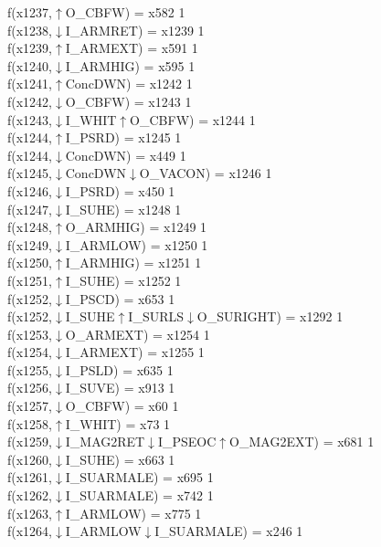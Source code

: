 f(x1237,$\uparrow$O\_CBFW) = x582 {1} \\
f(x1238,$\downarrow$I\_ARMRET) = x1239 {1} \\
f(x1239,$\uparrow$I\_ARMEXT) = x591 {1} \\
f(x1240,$\downarrow$I\_ARMHIG) = x595 {1} \\
f(x1241,$\uparrow$ConcDWN) = x1242 {1} \\
f(x1242,$\downarrow$O\_CBFW) = x1243 {1} \\
f(x1243,$\downarrow$I\_WHIT$\uparrow$O\_CBFW) = x1244 {1} \\
f(x1244,$\uparrow$I\_PSRD) = x1245 {1} \\
f(x1244,$\downarrow$ConcDWN) = x449 {1} \\
f(x1245,$\downarrow$ConcDWN$\downarrow$O\_VACON) = x1246 {1} \\
f(x1246,$\downarrow$I\_PSRD) = x450 {1} \\
f(x1247,$\downarrow$I\_SUHE) = x1248 {1} \\
f(x1248,$\uparrow$O\_ARMHIG) = x1249 {1} \\
f(x1249,$\downarrow$I\_ARMLOW) = x1250 {1} \\
f(x1250,$\uparrow$I\_ARMHIG) = x1251 {1} \\
f(x1251,$\uparrow$I\_SUHE) = x1252 {1} \\
f(x1252,$\downarrow$I\_PSCD) = x653 {1} \\
f(x1252,$\downarrow$I\_SUHE$\uparrow$I\_SURLS$\downarrow$O\_SURIGHT) = x1292 {1} \\
f(x1253,$\downarrow$O\_ARMEXT) = x1254 {1} \\
f(x1254,$\downarrow$I\_ARMEXT) = x1255 {1} \\
f(x1255,$\downarrow$I\_PSLD) = x635 {1} \\
f(x1256,$\downarrow$I\_SUVE) = x913 {1} \\
f(x1257,$\downarrow$O\_CBFW) = x60 {1} \\
f(x1258,$\uparrow$I\_WHIT) = x73 {1} \\
f(x1259,$\downarrow$I\_MAG2RET$\downarrow$I\_PSEOC$\uparrow$O\_MAG2EXT) = x681 {1} \\
f(x1260,$\downarrow$I\_SUHE) = x663 {1} \\
f(x1261,$\downarrow$I\_SUARMALE) = x695 {1} \\
f(x1262,$\downarrow$I\_SUARMALE) = x742 {1} \\
f(x1263,$\uparrow$I\_ARMLOW) = x775 {1} \\
f(x1264,$\downarrow$I\_ARMLOW$\downarrow$I\_SUARMALE) = x246 {1} \\
